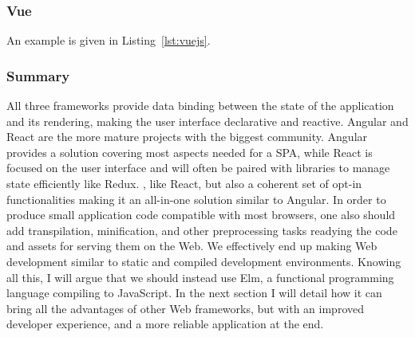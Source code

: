 


\subsubsection{Vue}%
\label{ssub:vue}

An example is given in Listing~\ref{lst:vuejs}.




\subsubsection{Summary}%
\label{ssub:summary}

All three frameworks provide data binding between the state of the application
and its rendering, making the user interface declarative and reactive.
Angular and React are the more mature projects with
the biggest community.
Angular provides a solution covering most aspects needed for a SPA,
while React is focused on the user interface and will often be paired
with libraries to manage state efficiently like Redux.
, like React,
but also a coherent set of opt-in functionalities making it an all-in-one solution similar to Angular.
In order to produce small application code compatible with most browsers,
one also should add transpilation, minification, and other preprocessing
tasks readying the code and assets for serving them on the Web.
We effectively end up making Web development similar
to static and compiled development environments.
Knowing all this, I will argue that we should instead use Elm,
a functional programming language compiling to JavaScript.
In the next section I will detail how it can bring
all the advantages of other Web frameworks,
but with an improved developer experience,
and a more reliable application at the end.

